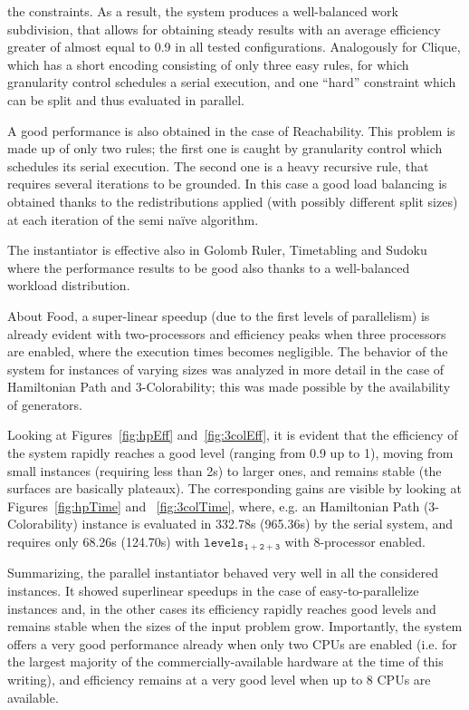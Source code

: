 \documentclass[preprint]{tlp}
\newcommand{\paral}{\ensuremath{\mathtt{levels_{1\!+\!2\!+\!3}}}\xspace}
\begin{document}
\noindent the constraints. As a result, the system produces a well-balanced work
subdivision, that allows for obtaining steady results with an average efficiency
greater of almost equal to 0.9 in all tested configurations.
Analogously for Clique, which has a short encoding consisting of only three easy rules, for which
granularity control schedules a serial execution, and one ``hard''
constraint which can be split and thus evaluated in parallel.

A good performance is also
obtained in the case of Reachability. This problem is made up of only
two rules; the first one is caught by granularity control
which schedules its serial execution. The second one is a heavy recursive rule,
that requires several iterations to be grounded.
In this case a good load
balancing is obtained thanks to the
redistributions applied (with possibly different split sizes)
at each iteration of the semi na\"ive algorithm.

The instantiator is effective
also in Golomb Ruler, Timetabling and Sudoku where
the performance results to be good also
thanks to a well-balanced workload distribution.

About Food, a super-linear speedup (due to the first levels of parallelism) is already evident with two-processors and
efficiency peaks when three processors are enabled, where the execution times becomes negligible.
The behavior of the system for instances of varying sizes
was analyzed in more detail in the case of Hamiltonian Path and 3-Colorability;
this was made possible by the availability of generators.

Looking at Figures~\ref{fig:hpEff} and~\ref{fig:3colEff}, it is evident that the efficiency of the system
rapidly reaches a good level (ranging from  0.9 up to 1), moving from small instances
(requiring less than 2s) to larger ones, and remains stable
(the surfaces are basically plateaux).
The corresponding gains are visible by looking at Figures~\ref{fig:hpTime} and ~\ref{fig:3colTime},
where, e.g. an Hamiltonian Path (3-Colorability) instance is evaluated in 332.78s (965.36s) by the serial system,
and requires only 68.26s (124.70s) with \paral with 8-processor enabled.

Summarizing, the parallel instantiator behaved very well in all the considered
instances. It showed superlinear speedups in the case of easy-to-parallelize instances
and, in the other cases its efficiency rapidly reaches good levels and remains stable
when the sizes of the input problem grow. Importantly, the system offers a very good
performance already when only two CPUs are enabled (i.e. for the largest majority of the
commercially-available hardware at the time of this writing), and efficiency remains
at a very good level when up to 8 CPUs are available.
\end{document}
